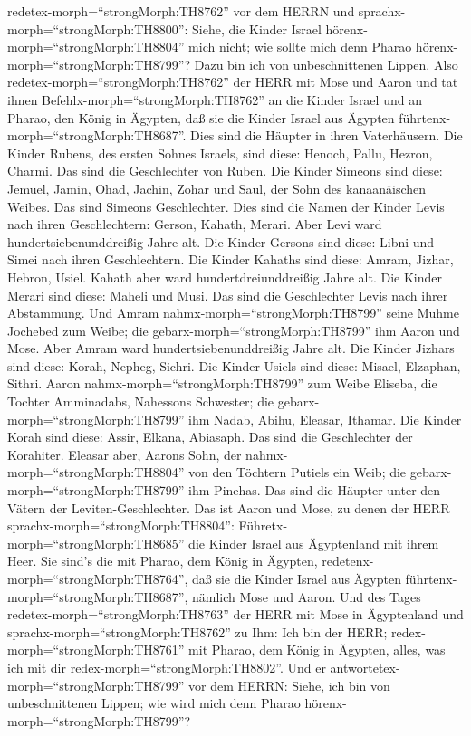 redetex-morph=``strongMorph:TH8762'' vor dem HERRN und
sprachx-morph=``strongMorph:TH8800'': Siehe, die Kinder Israel
hörenx-morph=``strongMorph:TH8804'' mich nicht; wie sollte mich denn
Pharao hörenx-morph=``strongMorph:TH8799''? Dazu bin ich von
unbeschnittenen Lippen.  Also
redetex-morph=``strongMorph:TH8762'' der HERR mit Mose und Aaron und tat
ihnen Befehlx-morph=``strongMorph:TH8762'' an die Kinder Israel und an
Pharao, den König in Ägypten, daß sie die Kinder Israel aus Ägypten
führtenx-morph=``strongMorph:TH8687''.  Dies sind die
Häupter in ihren Vaterhäusern. Die Kinder Rubens, des ersten Sohnes
Israels, sind diese: Henoch, Pallu, Hezron, Charmi. Das sind die
Geschlechter von Ruben.  Die Kinder Simeons sind diese:
Jemuel, Jamin, Ohad, Jachin, Zohar und Saul, der Sohn des kanaanäischen
Weibes. Das sind Simeons Geschlechter.  Dies sind die Namen
der Kinder Levis nach ihren Geschlechtern: Gerson, Kahath, Merari. Aber
Levi ward hundertsiebenunddreißig Jahre alt.  Die Kinder
Gersons sind diese: Libni und Simei nach ihren Geschlechtern.
 Die Kinder Kahaths sind diese: Amram, Jizhar, Hebron,
Usiel. Kahath aber ward hundertdreiunddreißig Jahre alt. 
Die Kinder Merari sind diese: Maheli und Musi. Das sind die Geschlechter
Levis nach ihrer Abstammung.  Und Amram
nahmx-morph=``strongMorph:TH8799'' seine Muhme Jochebed zum Weibe; die
gebarx-morph=``strongMorph:TH8799'' ihm Aaron und Mose. Aber Amram ward
hundertsiebenunddreißig Jahre alt.  Die Kinder Jizhars sind
diese: Korah, Nepheg, Sichri.  Die Kinder Usiels sind
diese: Misael, Elzaphan, Sithri.  Aaron
nahmx-morph=``strongMorph:TH8799'' zum Weibe Eliseba, die Tochter
Amminadabs, Nahessons Schwester; die gebarx-morph=``strongMorph:TH8799''
ihm Nadab, Abihu, Eleasar, Ithamar.  Die Kinder Korah sind
diese: Assir, Elkana, Abiasaph. Das sind die Geschlechter der Korahiter.
 Eleasar aber, Aarons Sohn, der
nahmx-morph=``strongMorph:TH8804'' von den Töchtern Putiels ein Weib;
die gebarx-morph=``strongMorph:TH8799'' ihm Pinehas. Das sind die
Häupter unter den Vätern der Leviten-Geschlechter.  Das ist
Aaron und Mose, zu denen der HERR sprachx-morph=``strongMorph:TH8804'':
Führetx-morph=``strongMorph:TH8685'' die Kinder Israel aus Ägyptenland
mit ihrem Heer.  Sie sind's die mit Pharao, dem König in
Ägypten, redetenx-morph=``strongMorph:TH8764'', daß sie die Kinder
Israel aus Ägypten führtenx-morph=``strongMorph:TH8687'', nämlich Mose
und Aaron.  Und des Tages
redetex-morph=``strongMorph:TH8763'' der HERR mit Mose in Ägyptenland
 und sprachx-morph=``strongMorph:TH8762'' zu Ihm: Ich bin
der HERR; redex-morph=``strongMorph:TH8761'' mit Pharao, dem König in
Ägypten, alles, was ich mit dir redex-morph=``strongMorph:TH8802''.
 Und er antwortetex-morph=``strongMorph:TH8799'' vor dem
HERRN: Siehe, ich bin von unbeschnittenen Lippen; wie wird mich denn
Pharao hörenx-morph=``strongMorph:TH8799''?

